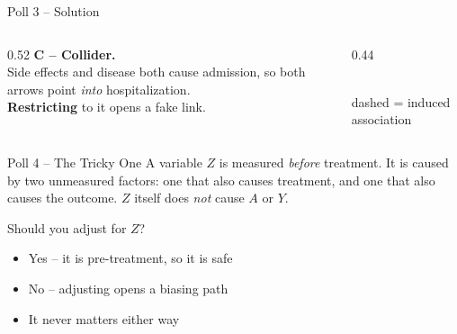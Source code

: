 \documentclass[aspectratio=169]{beamer}
\begin{document}
\begin{frame}{Poll 3 \;--\; Solution}
  \small
  \begin{columns}[T]
    \begin{column}{0.52\textwidth}
      \textcolor{good}{\textbf{C -- Collider.}}\\[0.4em]
      Side effects and disease both cause admission, so both arrows point
      \emph{into} hospitalization.\\[0.4em]
      \textcolor{brick}{\textbf{Restricting}} to it opens a fake link.
    \end{column}
    \begin{column}{0.44\textwidth}
      \centering
      \\[0.3em]
      {\scriptsize\textcolor{brick}{dashed = induced association}}
    \end{column}
  \end{columns}
\end{frame}

\begin{frame}{Poll 4 \;--\; The Tricky One}
  \small
  A variable $Z$ is measured \emph{before} treatment. It is caused by two
  unmeasured factors: one that also causes treatment, and one that also
  causes the outcome. $Z$ itself does \emph{not} cause $A$ or $Y$.
  \vspace{0.8em}

  Should you adjust for $Z$?
  \begin{itemize}
    \item[\textbf{A.}] Yes -- it is pre-treatment, so it is safe
    \item[\textbf{B.}] No -- adjusting opens a biasing path
    \item[\textbf{C.}] It never matters either way
  \end{itemize}
\end{frame}
\end{document}
